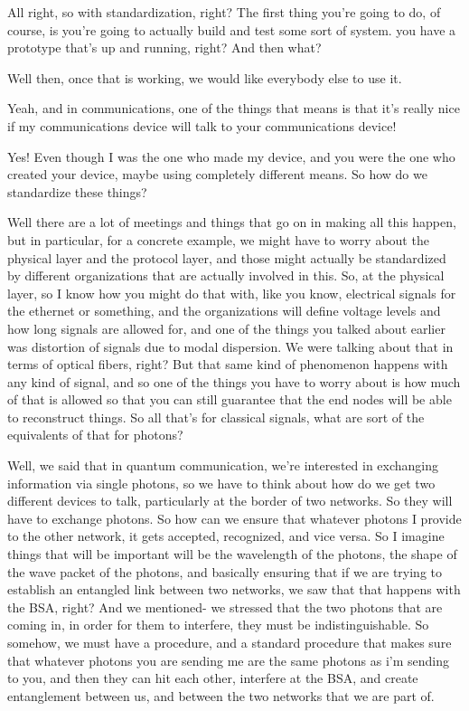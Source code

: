 All right, so with standardization, right? The first thing you're going to do, of course, is you're going to actually build and test some sort of system. you have a prototype that's up and running, right? And then what?

Well then, once that is working, we would like everybody else to use it.

Yeah, and in communications, one of the things that means is that it's really nice if my communications device will talk to your communications device!

Yes! Even though I was the one who made my device, and you were the one who created your device, maybe using completely different means. So how do we standardize these things?

Well there are a lot of meetings and things that go on in making all this happen, but in particular, for a concrete example, we might have to worry about the physical layer and the protocol layer, and those might actually be standardized by different organizations that are actually involved in this. So, at the physical layer, so I know how you might do that with, like you know, electrical signals for the ethernet or something, and the organizations will define voltage levels and how long signals are allowed for, and one of the things you talked about earlier was distortion of signals due to modal dispersion. We were talking about that in terms of optical fibers, right? But that same kind of phenomenon happens with any kind of signal, and so one of the things you have to worry about is how much of that is allowed so that you can still guarantee that the end nodes will be able to reconstruct things. So all that's for classical signals, what are sort of the equivalents of that for photons?

Well, we said that in quantum communication, we're interested in exchanging information via single photons, so we have to think about how do we get two different devices to talk, particularly at the border of two networks. So they will have to exchange photons. So how can we ensure that whatever photons I provide to the other network, it gets accepted, recognized, and vice versa. So I imagine things that will be important will be the wavelength of the photons, the shape of the wave packet of the photons, and basically ensuring that if we are trying to establish an entangled link between two networks, we saw that that happens with the BSA, right? And we mentioned- we stressed that the two photons that are coming in, in order for them to interfere, they must be indistinguishable. So somehow, we must have a procedure, and a standard procedure that makes sure that whatever photons you are sending me are the same photons as i'm sending to you, and then they can hit each other, interfere at the BSA, and create entanglement between us, and between the two networks that we are part of.

